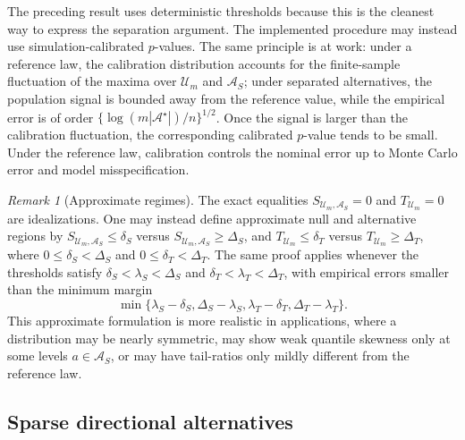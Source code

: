 \documentclass[11pt]{article}
\theoremstyle{plain}
\theoremstyle{definition}
\theoremstyle{remark}
\newtheorem{remark}{Remark}
\begin{document}
The preceding result uses deterministic thresholds because this is the cleanest way to express the separation argument. The implemented procedure may instead use simulation-calibrated \(p\)-values. The same principle is at work: under a reference law, the calibration distribution accounts for the finite-sample fluctuation of the maxima over \(\mathcal U_m\) and \(\mathcal A_S\); under separated alternatives, the population signal is bounded away from the reference value, while the empirical error is of order \(\{\log(m|\mathcal A^\star|)/n\}^{1/2}\). Once the signal is larger than the calibration fluctuation, the corresponding calibrated \(p\)-value tends to be small. Under the reference law, calibration controls the nominal error up to Monte Carlo error and model misspecification.

\begin{remark}[Approximate regimes]
	\label{rem:approximate_regimes}
	The exact equalities \(S_{\mathcal U_m,\mathcal A_S}=0\) and \(T_{\mathcal U_m}=0\) are idealizations. One may instead define approximate null and alternative regions by \(S_{\mathcal U_m,\mathcal A_S}\le\delta_S\) versus \(S_{\mathcal U_m,\mathcal A_S}\ge\Delta_S\), and \(T_{\mathcal U_m}\le\delta_T\) versus \(T_{\mathcal U_m}\ge\Delta_T\), where \(0\le\delta_S<\Delta_S\) and \(0\le\delta_T<\Delta_T\). The same proof applies whenever the thresholds satisfy \(\delta_S<\lambda_S<\Delta_S\) and \(\delta_T<\lambda_T<\Delta_T\), with empirical errors smaller than the minimum margin
	\[
	\min\{\lambda_S-\delta_S,\Delta_S-\lambda_S,\lambda_T-\delta_T,\Delta_T-\lambda_T\}.
	\]
	This approximate formulation is more realistic in applications, where a distribution may be nearly symmetric, may show weak quantile skewness only at some levels \(a\in\mathcal A_S\), or may have tail-ratios only mildly different from the reference law.
\end{remark}

\subsection{Sparse directional alternatives}
\label{subsec:sparse_directional_alternatives}
\end{document}
